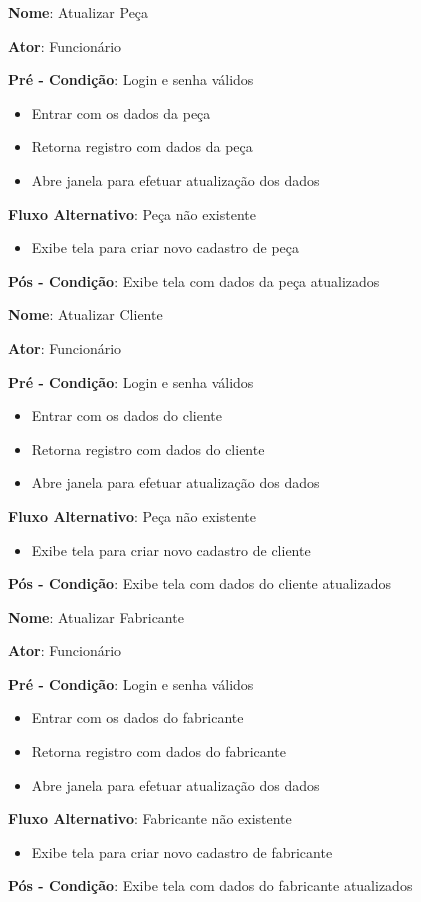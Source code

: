 \documentclass[a4paper,10pt]{article}
\begin{document}
\begin{framed}
\textbf{Nome}: Atualizar Peça

\textbf{Ator}: Funcionário

\textbf{Pré - Condição}: Login e senha válidos
\begin{itemize}
\item Entrar com os dados da peça
\item Retorna registro com dados da peça
\item Abre janela para efetuar atualização dos dados
\end{itemize}
\textbf{Fluxo Alternativo}: Peça não existente
\begin{itemize}
\item Exibe  tela para criar novo cadastro de peça
\end{itemize}
\textbf{Pós - Condição}: Exibe tela com dados da peça atualizados
\end{framed}

\begin{framed}
\textbf{Nome}: Atualizar Cliente

\textbf{Ator}: Funcionário

\textbf{Pré - Condição}: Login e senha válidos
\begin{itemize}
\item Entrar com os dados do cliente 
\item Retorna registro com dados do cliente 
\item Abre  janela para efetuar atualização dos dados
\end{itemize}
\textbf{Fluxo Alternativo}: Peça não existente
\begin{itemize}
\item Exibe  tela para criar novo cadastro de cliente
\end{itemize}
\textbf{Pós - Condição}: Exibe tela com dados do cliente atualizados
\end{framed}

\begin{framed}
\textbf{Nome}: Atualizar Fabricante 

\textbf{Ator}: Funcionário

\textbf{Pré - Condição}: Login e senha válidos
\begin{itemize}
\item Entrar com os dados do fabricante
\item Retorna registro com dados do fabricante 
\item Abre  janela para efetuar atualização dos dados
\end{itemize}
\textbf{Fluxo Alternativo}: Fabricante não existente
\begin{itemize}
\item Exibe  tela para criar novo cadastro de fabricante
\end{itemize}
\textbf{Pós - Condição}: Exibe tela com dados do fabricante atualizados
\end{framed}
\end{document}
